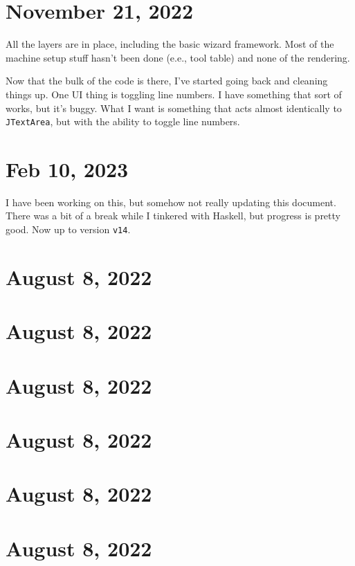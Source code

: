 \documentclass{article}
\begin{document}
\section{November 21, 2022}

All the layers are in place, including the basic wizard
framework. Most of the machine setup stuff hasn't been done (e.e., tool
table) and none of the rendering.

Now that the bulk of the code is there, I've started going back and
cleaning things up. One UI thing is toggling line numbers. I have
something that sort of works, but it's buggy. What I want is something
that acts almost identically to {\tt JTextArea}, but with the ability
to toggle line numbers.

\section{Feb 10, 2023}

I have been working on this, but somehow not really updating this
document. There was a bit of a break while I tinkered with Haskell,
but progress is pretty good. Now up to version {\tt v14}. 


\section{August 8, 2022}
\section{August 8, 2022}
\section{August 8, 2022}
\section{August 8, 2022}
\section{August 8, 2022}
\section{August 8, 2022}
\end{document}
